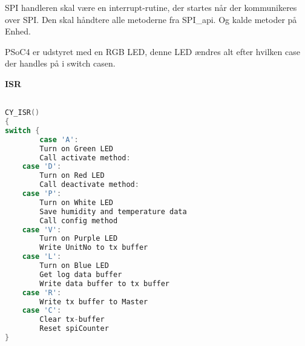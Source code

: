 
SPI handleren skal være en interrupt-rutine, der startes når der kommunikeres over SPI. Den skal håndtere alle metoderne fra SPI\_api. Og kalde metoder på Enhed.

PSoC4 er udstyret med en RGB LED, denne LED ændres alt efter hvilken case der handles på i switch casen. 


\textbf{ISR}

\begin{lstlisting}[language=C]

CY_ISR()
{
switch {
    	case 'A':
		Turn on Green LED
		Call activate method:                
	case 'D':
		Turn on Red LED
		Call deactivate method:  
	case 'P':
		Turn on White LED			
		Save humidity and temperature data            
		Call config method
	case 'V':
		Turn on Purple LED  
		Write UnitNo to tx buffer  
	case 'L':
		Turn on Blue LED
		Get log data buffer
		Write data buffer to tx buffer
	case 'R':
		Write tx buffer to Master
	case 'C':
		Clear tx-buffer
		Reset spiCounter 
}
\end{lstlisting}